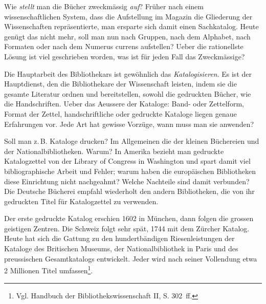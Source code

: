 \documentclass[a4paper,
fontsize=11pt,
oneside,
numbers=noperiodatend,
parskip=half-,
bibliography=totoc,
final
]{scrartcl}
\begin{document}
Wie \emph{stellt} man die Bücher zweckmässig \emph{auf}? Früher nach
einem wissenschaftlichen System, dass die Aufstellung im Magazin die
Gliederung der Wissenschaften repräsentierte, man ersparte sich damit
einen Sachkatalog. Heute genügt das nicht mehr, soll man nun nach
Gruppen, nach dem Alphabet, nach Formaten oder nach dem Numerus currens
aufstellen? Ueber die rationellste Lösung ist viel geschrieben worden,
was ist für jeden Fall das Zweckmässige?

Die Hauptarbeit des Bibliothekars ist gewöhnlich das
\emph{Katalogisieren}. Es ist der Hauptdienst, den die Bibliothekare der
Wissenschaft leisten, indem sie die gesamte Literatur ordnen und
bereitstellen, sowohl die gedruckten Bücher, wie die Handschriften.
Ueber das Aeussere der Kataloge: Band- oder Zettelform, Format der
Zettel, handschriftliche oder gedruckte Kataloge liegen genaue
Erfahrungen vor. Jede Art hat gewisse Vorzüge, wann muss man sie
anwenden?

Soll man z.\,B. Kataloge drucken? Im Allgemeinen die der kleinen
Büchereien und der Nationalbibliotheken. Warum? In Amerika bezieht man
gedruckte Katalogzettel von der Library of Congress in Washington und
spart damit viel bibliographische Arbeit und Fehler; warum haben die
europäischen Bibliotheken diese Einrichtung nicht nachgeahmt? Welche
Nachteile sind damit verbunden? Die Deutsche Bücherei empfahl wiederholt
den andern Bibliotheken, die von ihr gedruckten Titel für Katalogzettel
zu verwenden.

Der erste gedruckte Katalog erschien 1602 in München, dann folgen die
grossen geistigen Zentren. Die Schweiz folgt sehr spät, 1744 mit dem
Zürcher Katalog. Heute hat sich die Gattung zu den hundertbändigen
Riesenleistungen der Kataloge des Britischen Museums, der
Nationalbibliothek in Paris und des preussischen Gesamtkatalogs
entwickelt. Jeder wird nach seiner Vollendung etwa 2 Millionen Titel
umfassen\footnote{Vgl. Handbuch der Bibliothekswissenschaft II, S. 302
 \,ff.}.
\end{document}
